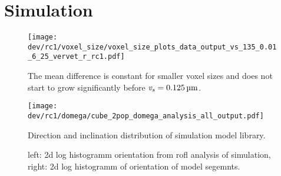 \chapter{Simulation}
\label{app:Simulation}
%
%
\begin{sidewaysfigure}[!p]
\end{sidewaysfigure}
%
%
\begin{figure}[!p]
\centering
\texttt{[image: dev/rc1/voxel\_size/voxel\_size\_plots\_data\_output\_vs\_135\_0.01\_6\_25\_vervet\_r\_rc1.pdf]}
\caption[voxel size model with noise]{The mean difference is constant for smaller voxel sizes and does not start to grow significantly before $\voxelsize=\SI{0.125}{\micro\meter}$.}
\label{app:voxelsizeNoise}
\end{figure}
%
%
%
%
\begin{figure}[!t]
    \centering
    \texttt{[image: dev/rc1/domega/cube\_2pop\_domega\_analysis\_all\_output.pdf]}
    \caption{Direction and inclination distribution of simulation model library.}
\end{figure}
%
%
%
%
%
\begin{figure}[!p]
\centering
%
\caption[sim]{left: 2d log histogramm orientation from rofl analysis of simulation, right: 2d log histogramm of orientation of model segemnts. }
\label{app:single_fiber_pop_hist_app}
\end{figure}
